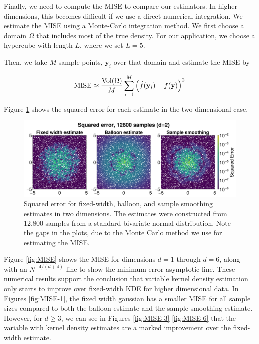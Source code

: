 \documentclass{article}
\begin{document}
Finally, we need to compute the MISE to compare our estimators. In higher dimensions, this becomes difficult if we use a direct numerical integration. We estimate the MISE using a Monte-Carlo integration method. We first choose a domain $\Omega$ that includes most of the true density. For our application, we choose a hypercube with length $L$, where we set $L=5$.

Then, we take $M$ sample points, $\mathbf{y}_i$ over that domain and estimate the MISE by 

\begin{equation}\label{eq:monte-carlo-MISE}
    \textup{MISE} \approx \frac{\textup{Vol}(\Omega)}{M}\sum_{i=1}^M \left(\hat{f}(\mathbf{y}_i) - f(\mathbf{y})\right)^2
\end{equation}

Figure \ref{fig:2d-visual} shows the squared error for each estimate in the two-dimensional case.

\begin{figure}
    \centering
    \includegraphics[width=\linewidth]{images/2D_visual.png}
    \caption{Squared error for fixed-width, balloon, and sample smoothing estimates in two dimensions. The estimates were constructed from 12,800 samples from a standard bivariate normal distribution. Note the gaps in the plots, due to the Monte Carlo method we use for estimating the MISE.}
    \label{fig:2d-visual}
\end{figure}

Figure \ref{fig:MISE} shows the MISE for dimensions $d=1$ through $d=6$, along with an $N^{-4/(d+4)}$ line to show the minimum error asymptotic line. These numerical results support the conclusion that variable kernel density estimation only starts to improve over fixed-width KDE for higher dimensional data. In Figures \ref{fig:MISE-1}, the fixed width gaussian has a smaller MISE for all sample sizes compared to both the balloon estimate and the sample smoothing estimate. However, for $d\geq3$, we can see in Figures \ref{fig:MISE-3}-\ref{fig:MISE-6} that the variable with kernel density estimates are a marked improvement over the fixed-width estimate.
\end{document}
